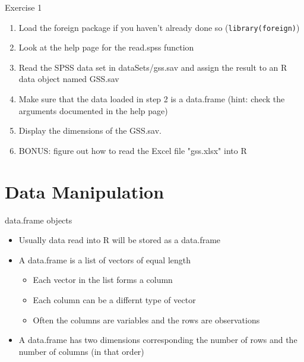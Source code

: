\documentclass[table,smaller]{beamer}
\begin{document}
\begin{frame}[fragile,label=sec-5-6]{Exercise 1}
 \begin{enumerate}
\item Load the foreign package if you haven't already done so (\verb~library(foreign)~)

\item Look at the help page for the read.spss function

\item Read the SPSS data set in dataSets/gss.sav and assign the result to an R data object named GSS.sav

\item Make sure that the data loaded in step 2 is a data.frame (hint: check the arguments documented in the help page)

\item Display the dimensions of the GSS.sav.

\item BONUS: figure out how to read the Excel file "gss.xlsx" into R
\end{enumerate}
\end{frame}


\section{Data Manipulation}
\label{sec-6}

\begin{frame}[label=sec-6-1]{data.frame objects}
\begin{itemize}
\item Usually data read into R will be stored as a \alert{data.frame}

\item A data.frame is a list of vectors of equal length
\begin{itemize}
\item Each vector in the list forms a column
\item Each column can be a differnt type of vector
\item Often the columns are variables and the rows are observations
\end{itemize}

\item A data.frame has two dimensions corresponding the number of rows and the number of columns (in that order)
\end{itemize}
\end{frame}
\end{document}
